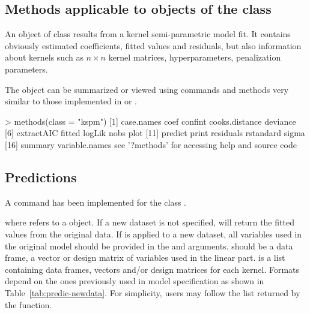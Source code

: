 \subsection{Methods  applicable to objects of the class } \label{package-kspm-class}

An object of class  results from a kernel semi-parametric model fit. It contains obviously estimated coefficients, fitted values and residuals, but also information about kernels such as $n \times n$ kernel matrices, hyperparameters, penalization parameters.

The  object can be summarized or viewed using commands and methods very similar to those implemented in  or .

\begin{example}
> methods(class = "kspm")
 [1] case.names  coef            confint    cooks.distance  deviance
 [6] extractAIC  fitted          logLik     nobs            plot
[11] predict     print           residuals  rstandard       sigma 
[16] summary     variable.names
see '?methods' for accessing help and source code
\end{example}




\subsection{Predictions} \label{sec:package-predict}

A  command has been implemented for the class .


where  refers to a  object. If a new dataset is not specified,  will return the fitted values from the original data. If  is applied to a new dataset, all variables used in the original model should be provided in the  and  arguments.  should be a data frame, a vector or design matrix of variables used in the linear part.  is a list containing data frames, vectors and/or design matrices for each kernel. Formats depend on the ones previously used in model specification as shown in Table~\ref{tab:predic-newdata}. For simplicity, users may follow the list returned by the  function.


